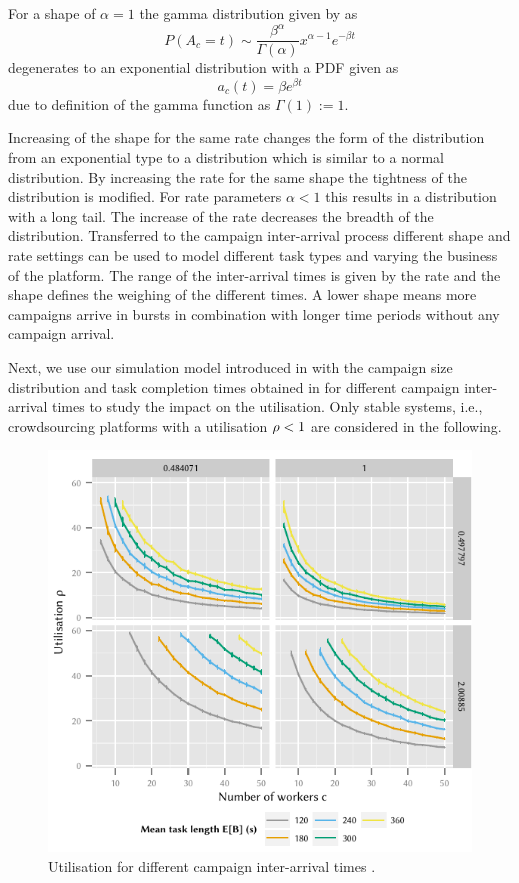 For a shape of \(\alpha = 1\) the gamma distribution given by as
\[
P(A_c=t) \sim \frac{\beta^\alpha}{\Gamma(\alpha)} x^{\alpha-1} e^{-{\beta}t}
\]
degenerates to an exponential distribution with a \gls{PDF} given as
 \[
a_c(t) = \beta e^{\beta t}
 \]
due to definition of the gamma function as \(\Gamma(1) := 1\).

Increasing of the shape for the same rate changes the form of the distribution from an exponential type to a distribution which is similar to a normal distribution.
By increasing the rate for the same shape the tightness of the distribution is modified.
For rate parameters \(\alpha < 1\) this results in a distribution with a long tail.
The increase of the rate decreases the breadth of the distribution.
Transferred to the campaign inter-arrival process \campaignIAT different shape and rate settings can be used to model different task types and varying the business of the platform.
The range of the inter-arrival times is given by the rate and the shape defines the weighing of the different times.
A lower shape means more campaigns arrive in bursts in combination with longer time periods without any campaign arrival.

Next, we use our simulation model introduced in  with the campaign size distribution \campaignSize and task completion times \taskDuration obtained in  for different campaign inter-arrival times to study the impact on the utilisation.
Only stable systems, i.e., crowdsourcing platforms with a utilisation \(\rho < 1\) are considered in the following.

\begin{figure}
	\centering
	\includegraphics{cloud/crowdsourcing/numerical_evaluation/figures/parameter_utilization}
	\caption{Utilisation \workerUtilization for different campaign inter-arrival times \campaignIAT.}
	\label{fig:cloud:crowdsourcing:performance_evaluation:distributions:parameter_utilization}
\end{figure}

